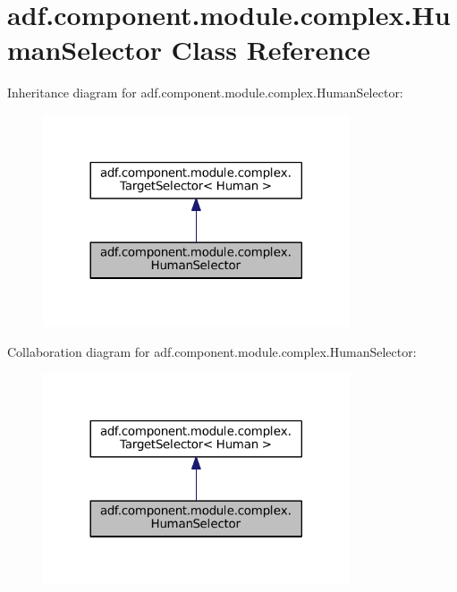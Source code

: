\hypertarget{classadf_1_1component_1_1module_1_1complex_1_1HumanSelector}{}\section{adf.\+component.\+module.\+complex.\+Human\+Selector Class Reference}
\label{classadf_1_1component_1_1module_1_1complex_1_1HumanSelector}


Inheritance diagram for adf.\+component.\+module.\+complex.\+Human\+Selector\+:
\nopagebreak
\begin{figure}[H]
\begin{center}
\leavevmode
\includegraphics[width=257pt]{classadf_1_1component_1_1module_1_1complex_1_1HumanSelector__inherit__graph}
\end{center}
\end{figure}


Collaboration diagram for adf.\+component.\+module.\+complex.\+Human\+Selector\+:
\nopagebreak
\begin{figure}[H]
\begin{center}
\leavevmode
\includegraphics[width=257pt]{classadf_1_1component_1_1module_1_1complex_1_1HumanSelector__coll__graph}
\end{center}
\end{figure}
